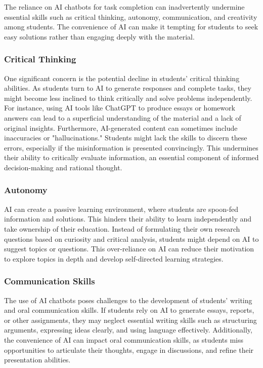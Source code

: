 \documentclass{article}
\begin{document}
The reliance on AI chatbots for task completion can inadvertently undermine essential skills such as critical thinking, autonomy, communication, and creativity among students. The convenience of AI can make it tempting for students to seek easy solutions rather than engaging deeply with the material.

\subsubsection{Critical Thinking}

One significant concern is the potential decline in students' critical thinking abilities. As students turn to AI to generate responses and complete tasks, they might become less inclined to think critically and solve problems independently. For instance, using AI tools like ChatGPT to produce essays or homework answers can lead to a superficial understanding of the material and a lack of original insights. Furthermore, AI-generated content can sometimes include inaccuracies or "hallucinations." Students might lack the skills to discern these errors, especially if the misinformation is presented convincingly. This undermines their ability to critically evaluate information, an essential component of informed decision-making and rational thought.

\subsubsection{Autonomy}

AI can create a passive learning environment, where students are spoon-fed information and solutions. This hinders their ability to learn independently and take ownership of their education. Instead of formulating their own research questions based on curiosity and critical analysis, students might depend on AI to suggest topics or questions. This over-reliance on AI can reduce their motivation to explore topics in depth and develop self-directed learning strategies.

\subsubsection{Communication Skills}

The use of AI chatbots poses challenges to the development of students' writing and oral communication skills. If students rely on AI to generate essays, reports, or other assignments, they may neglect essential writing skills such as structuring arguments, expressing ideas clearly, and using language effectively. Additionally, the convenience of AI can impact oral communication skills, as students miss opportunities to articulate their thoughts, engage in discussions, and refine their presentation abilities.
\end{document}
